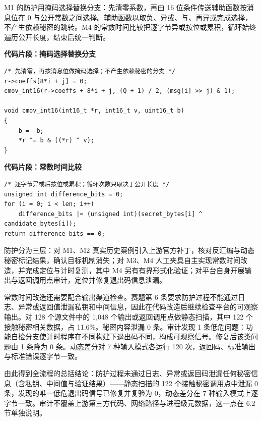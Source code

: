 M1 的防护用掩码选择替换分支：先清零系数，再由 16 位条件传送辅助函数按消息位在 0 与公开常数之间选择。辅助函数以取负、异或、与、再异或完成选择，不产生依赖秘密的跳转。M4 的常数时间比较把逐字节异或按位或累积，循环始终遍历公开长度，结束后统一判断。

\noindent\begin{minipage}{\linewidth}
\noindent\textbf{代码片段：掩码选择替换分支}\par\smallskip
\begin{lstlisting}
/* 先清零，再按消息位做掩码选择；不产生依赖秘密的分支 */
r->coeffs[8*i + j] = 0;
cmov_int16(r->coeffs + 8*i + j, (Q + 1) / 2, (msg[i] >> j) & 1);

void cmov_int16(int16_t *r, int16_t v, uint16_t b)
{
    b = -b;
    *r ^= b & ((*r) ^ v);
}
\end{lstlisting}
\end{minipage}

\noindent\begin{minipage}{\linewidth}
\noindent\textbf{代码片段：常数时间比较}\par\smallskip
\begin{lstlisting}
/* 逐字节异或后按位或累积；循环次数只取决于公开长度 */
unsigned int difference_bits = 0;
for (i = 0; i < len; i++)
    difference_bits |= (unsigned int)(secret_bytes[i] ^ candidate_bytes[i]);
return difference_bits == 0;
\end{lstlisting}
\end{minipage}

防护分为三层：对 M1、M2 真实历史案例引入上游官方补丁，核对反汇编与动态秘密标记结果，确认目标机制消失；对 M3、M4 人工夹具自主实现常数时间改造，并完成定位与计时复测，其中 M4 另有有界形式化验证；对平台自身开展输出与返回调用点审计，定位并修复退出码信息泄漏。

常数时间改造还需要配合输出渠道检查。赛题第 6 条要求防护过程不能通过日志、异常或返回值泄漏私钥和中间信息，因此在代码改造后继续检查平台的可观察输出。对 128 个源文件中的 1,048 个输出或返回调用点做静态扫描，其中 122 个接触秘密相关数据，占 11.6\%。秘密内容泄漏 0 条。审计发现 1 条低危问题：功能自检分支使计时程序在不同构建下退出码不同，构成可观察信号。修复后该类问题由 1 条降为 0 条。动态差分对 7 种输入模式各运行 120 次，返回码、标准输出与标准错误逐字节一致。 %

由此得到全流程的总括结论：防护过程未通过日志、异常或返回码泄漏任何秘密信息（含私钥、中间值与验证结果）——静态扫描的 122 个接触秘密调用点中泄漏 0 条，发现的唯一低危退出码信号已修复并复验为 0，动态差分在 7 种输入模式上逐字节一致。审计不覆盖上游第三方代码、网络路径与进程级元数据，这一点在 6.2 节单独说明。

